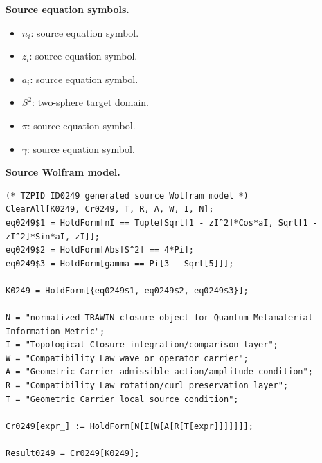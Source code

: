 \begin{minipage}[t]{0.49\linewidth}
\begingroup
\small
\raggedright
\textbf{Source equation symbols.}\par
\begin{itemize}[leftmargin=1.35em,itemsep=1pt,topsep=1pt,parsep=0pt]
    \item $n_i$: source equation symbol.
    \item $z_i$: source equation symbol.
    \item $a_i$: source equation symbol.
    \item $S^2$: two-sphere target domain.
    \item $\pi$: source equation symbol.
    \item $\gamma$: source equation symbol.
\end{itemize}
\endgroup
\end{minipage}\hfill
\begin{minipage}[t]{0.47\linewidth}
\begingroup
\scriptsize
\raggedright
\textbf{Source Wolfram model.}\par
\begin{Verbatim}[fontsize=\tiny,breaklines=true,breakanywhere=true]
(* TZPID ID0249 generated source Wolfram model *)
ClearAll[K0249, Cr0249, T, R, A, W, I, N];
eq0249$1 = HoldForm[nI == Tuple[Sqrt[1 - zI^2]*Cos*aI, Sqrt[1 - zI^2]*Sin*aI, zI]];
eq0249$2 = HoldForm[Abs[S^2] == 4*Pi];
eq0249$3 = HoldForm[gamma == Pi[3 - Sqrt[5]]];

K0249 = HoldForm[{eq0249$1, eq0249$2, eq0249$3}];

N = "normalized TRAWIN closure object for Quantum Metamaterial Information Metric";
I = "Topological Closure integration/comparison layer";
W = "Compatibility Law wave or operator carrier";
A = "Geometric Carrier admissible action/amplitude condition";
R = "Compatibility Law rotation/curl preservation layer";
T = "Geometric Carrier local source condition";

Cr0249[expr_] := HoldForm[N[I[W[A[R[T[expr]]]]]]];

Result0249 = Cr0249[K0249];
\end{Verbatim}
\endgroup
\end{minipage}

